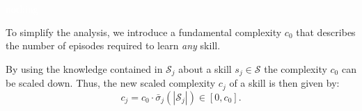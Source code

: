 
\textcolor{white}{nothing}

\begin{tcolorbox}
\begin{assumption}\label{definition:joint_grouping} To simplify the analysis, we introduce a fundamental complexity $c_0$ that describes the number of episodes required to learn \emph{any} skill.
\end{assumption}
\end{tcolorbox}
By using the knowledge contained in $\mathcal{S}_j$ about a skill $s_j \in \mathcal{S}$ the complexity $c_{0}$ can be scaled down. Thus, the new scaled complexity $c_j$ of a skill is then given by:
\begin{equation}\label{eq:scaled_complexity}
c_j = c_{0} \cdot \bar{\sigma}_{j}\left(|\mathcal{S}_j|\right)\in [0, c_{0}].
\end{equation}
